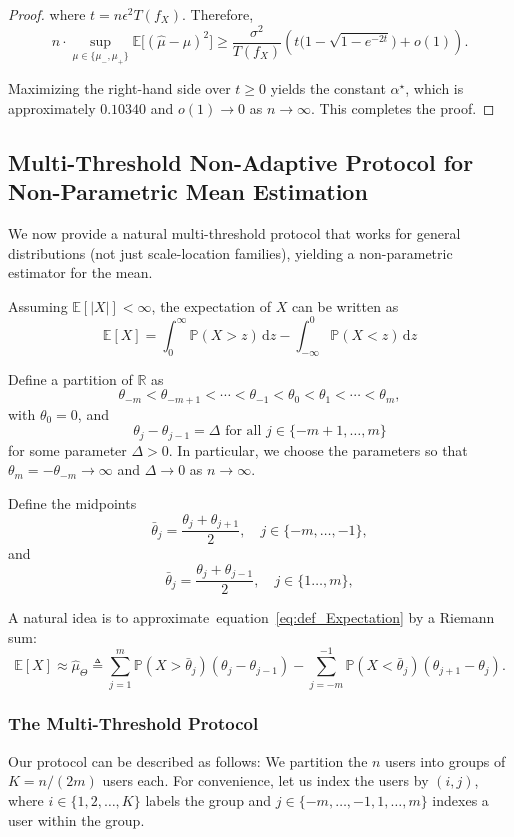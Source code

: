 \documentclass[10pt]{article} %
\def\eqref#1{equation~\ref{#1}}
\theoremstyle{plain}
\theoremstyle{definition}
\theoremstyle{remark}
\newcommand{\bE}{\mathbb E}
\newcommand{\bP}{\mathbb P}
\newcommand{\dx}{\mathrm{d}}
\begin{document}
\begin{proof}
where $t=n\epsilon^2 T(f_X)$. Therefore,
\[
n\cdot \sup_{\mu \in \{ \mu_-, \mu_+ \} } \bE \big[(\hat{\mu}-\mu)^2\big]
 \geq  \frac{\sigma^2}{T(f_X)} \left( t\Big(1-\sqrt{1-e^{-2t}}\Big) + o(1) \right).
\]

Maximizing the right-hand side over $t\ge 0$ yields the constant $\alpha^\star$, which is approximately $0.10340$ and $o(1) \to 0$ as $n \to \infty$. This completes the proof.
\end{proof}
\subsection{Multi-Threshold Non-Adaptive Protocol for Non-Parametric Mean Estimation}\label{subsec:multi_threshold_encode}

We now provide a natural multi-threshold protocol that works for general distributions (not just scale-location families), yielding a non-parametric estimator for the mean. 

Assuming $\bE[|X|] < \infty$, the expectation of $X$ can be written as
\begin{equation}
\bE[X] =  \int_{0}^{\infty} \bP(X > z) \, \dx z - \int_{-\infty}^{0} \bP(X < z) \, \dx z 
\label{eq:def_Expectation}
\end{equation}


Define a partition of $\mathbb{R}$ as
\[
\theta_{-m} < \theta_{-m+1} < \cdots < \theta_{-1} < \theta_0 < \theta_1 < \cdots < \theta_m,
\]
with $\theta_0=0$, and 
$$\theta_j-\theta_{j-1}=\Delta \text{ for all } j\in \{-m+1,\ldots,m\} $$
for some parameter $\Delta>0$.
In particular, we choose the parameters so that $\theta_m=-\theta_{-m}\to\infty$ and $\Delta\to 0$ as $n\to\infty$.

Define the midpoints
\[
\bar{\theta}_j = \frac{\theta_j + \theta_{j+1}}{2}, \quad j \in \{-m, \ldots, -1\},
\]
and 
\[
\bar{\theta}_j = \frac{\theta_j + \theta_{j-1}}{2}, \quad j \in \{1 \ldots, m\},
\]

A natural idea is to approximate~\eqref{eq:def_Expectation} by a Riemann sum:
\begin{equation}
\bE[X] \approx \hat{\mu}_{\Theta}\triangleq  \sum_{j=1}^{m} \bP(X > \bar{\theta}_j) (\theta_j - \theta_{j-1}) - \sum_{j=-m}^{-1} \bP(X < \bar{\theta}_j) (\theta_{j+1} - \theta_j).
\label{eq:Riemann}
\end{equation}

\subsubsection{The Multi-Threshold Protocol}
Our protocol can be described as follows: We partition the $n$ users into groups of $K=n/(2m)$ users each. For convenience, let us index the users by $(i,j)$, where $i\in \{1,2,\ldots,K\}$ labels the group and $j\in \{-m,\ldots,-1,1,\ldots,m\}$ indexes a user within the group.
\end{document}
